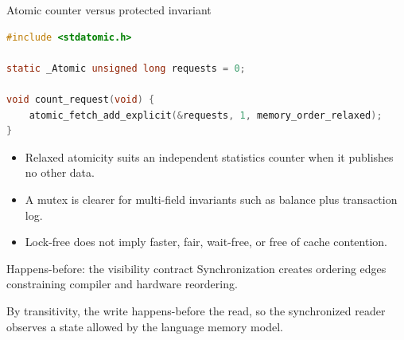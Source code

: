 \documentclass[aspectratio=169,11pt]{beamer}
\begin{document}
\begin{frame}[fragile]{Atomic counter versus protected invariant}
\begin{lstlisting}[language=C]
#include <stdatomic.h>

static _Atomic unsigned long requests = 0;

void count_request(void) {
    atomic_fetch_add_explicit(&requests, 1, memory_order_relaxed);
}
\end{lstlisting}
  \begin{itemize}
    \item Relaxed atomicity suits an independent statistics counter when it publishes no other data.
    \item A mutex is clearer for multi-field invariants such as balance plus transaction log.
    \item Lock-free does not imply faster, fair, wait-free, or free of cache contention.
  \end{itemize}
\end{frame}

\begin{frame}{Happens-before: the visibility contract}
  Synchronization creates ordering edges constraining compiler and hardware reordering.
  \begin{center}
  \end{center}
  By transitivity, the write happens-before the read, so the synchronized reader observes a state allowed by the language memory model.
\end{frame}
\end{document}
